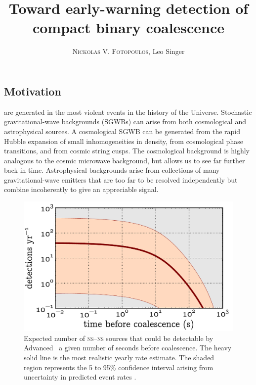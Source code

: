 \documentclass[portrait,plainboxedsections]{sciposter}
\title{Toward early-warning detection of compact binary coalescence}
\author{\textsc{Nickolas V. Fotopoulos}, Leo Singer}
\institute{LIGO Laboratory, California Institute of Technology}
\begin{document}

\maketitle

\begin{multicols}{3}

\section{Motivation}

 are generated in the most violent events in
the history of the Universe. Stochastic gravitational-wave backgrounds (SGWBs)
can arise from both cosmological and astrophysical sources.
A cosmological SGWB can be generated from the rapid Hubble expansion of small
inhomogeneities in density, from cosmological phase transitions, and from
cosmic string cusps. The cosmological background is highly analogous to the
cosmic microwave background, but allows us to see far further back in time.
Astrophysical backgrounds arise from collections of many gravitational-wave
emitters that are too far to be resolved independently but combine incoherently
to give an appreciable signal.
%
\begin{figure}[h]
\includegraphics{figures/snr_in_time}
\caption{\label{fig:earlywarning}Expected number of \textsc{ns}--\textsc{ns}
sources that could be detectable by Advanced \LIGO\ a given number of seconds
before coalescence.  The heavy solid line is the most realistic yearly rate
estimate.  The shaded region represents the 5 to 95\% confidence interval
arising from uncertainty in predicted event rates \cite{Abadie:2010p10836}.}

\end{figure}
\end{multicols}
\end{document}
